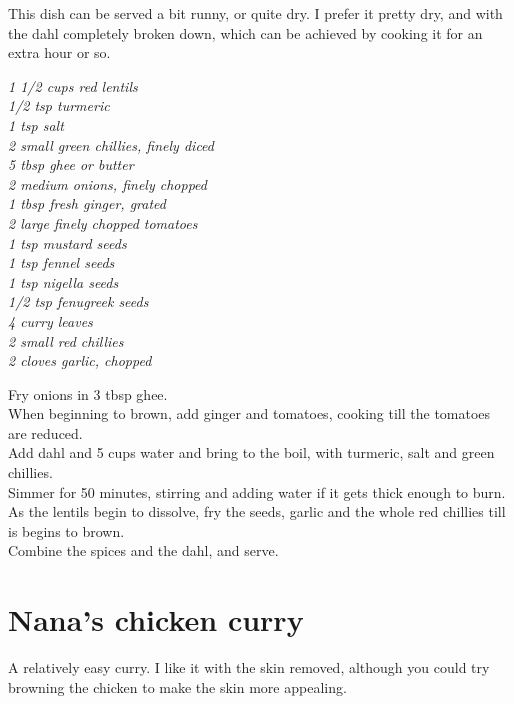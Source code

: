 \documentclass{tufte-book}
\begin{document}
This dish can be served a bit runny, or quite dry. I prefer it pretty dry, and with the dahl completely broken down, which can be achieved by cooking it for an extra hour or so.

\smallskip
\emph{1 1/2 cups red lentils
\\1/2 tsp turmeric
\\1 tsp salt
\\2 small green chillies, finely diced
\\5 tbsp ghee or butter
\\2 medium onions, finely chopped
\\1 tbsp fresh ginger, grated
\\2 large finely chopped tomatoes
\\1 tsp mustard seeds
\\1 tsp fennel seeds
\\1 tsp nigella seeds
\\1/2 tsp fenugreek seeds
\\4 curry leaves
\\2 small red chillies
\\2 cloves garlic, chopped}

\smallskip
Fry onions in 3 tbsp ghee. 
\\When beginning to brown, add ginger and tomatoes, cooking till the tomatoes are reduced.
\\Add dahl and 5 cups water and bring to the boil, with turmeric, salt and green chillies.
\\Simmer for 50 minutes, stirring and adding water if it gets thick enough to burn.
\\As the lentils begin to dissolve, fry the seeds, garlic and the whole red chillies till is begins to brown. 
\\Combine the spices and the dahl, and serve.


\section{Nana's chicken curry}

A relatively easy curry. I like it with the skin removed, although you could try browning the chicken to make the skin more appealing.
\end{document}
